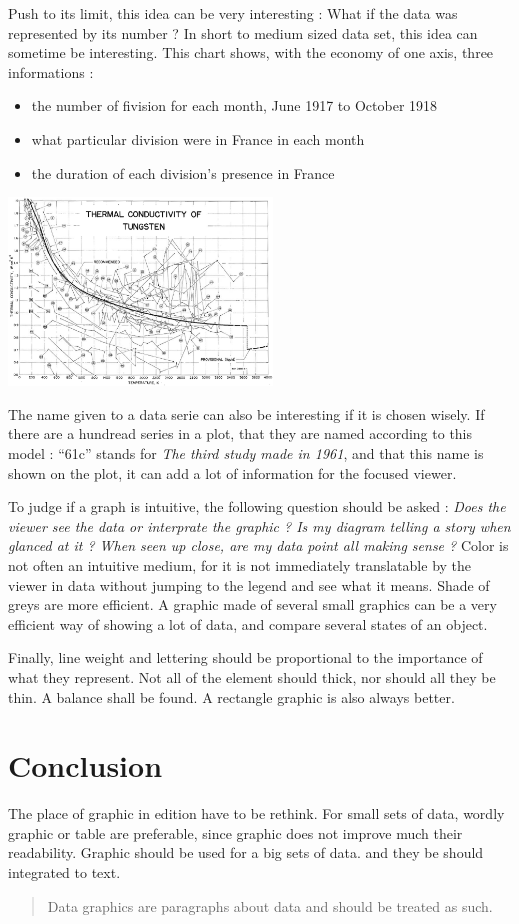  Push to its limit, this idea can be very interesting : What if the data was represented by its number ? In short to medium sized data set, this idea can sometime be interesting.
 This chart shows, with the economy of one axis, three informations : 

\begin{itemize}
\item the number of fivision for each month, June 1917 to October 1918
\item what particular division were in France in each month
\item the duration of each division's presence in France
\end{itemize}

\centerline{
\includegraphics[width=07cm]{./illustrations/annexes/relationel_tungsten.eps}
}
The name given to a data serie can also be interesting if it is chosen wisely.
 If there are a hundread series in a plot, that they are named according to this model : ``61c'' stands for \emph{The third study made in 1961}, and that this name is shown on the plot, it can add a lot of information for the focused viewer.

To judge if a graph is intuitive, the following question should be asked : \emph{Does the viewer see the data or interprate the graphic ? Is my diagram telling a story when glanced at it ? When seen up close, are my data point all making sense ?}
 Color is not often an intuitive medium, for it is not immediately translatable by the viewer in data without jumping to the legend and see what it means. Shade of greys are more efficient. A graphic made of several small graphics can be a very efficient way of showing a lot of data, and compare several states of an object.

Finally, line weight and lettering should be proportional to the importance of what they represent. Not all of the element should thick, nor should all they be thin. A balance shall be found. A rectangle graphic is also always better.
\section{Conclusion}

The place of graphic in edition have to be rethink. For small sets of data, wordly graphic or table are preferable, since graphic does not improve much their readability. Graphic should be used for a big sets of data. and they be should integrated to text. 
\begin{quote}
Data graphics are paragraphs about data and should be treated as such.
\end{quote}
